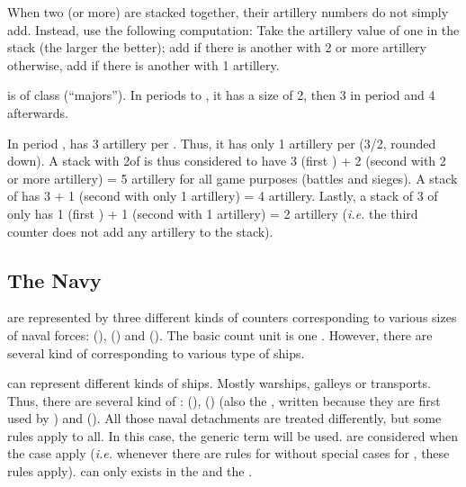 
 When two (or more) \ARMY are stacked together,
their artillery numbers do not simply add. Instead, use the following
computation:
\bparag Take the artillery value of one \ARMY in the stack (the larger the
better); add  if there is another \ARMY with 2 or more artillery
otherwise, add  if there is another \ARMY with 1 artillery.

\begin{exemple}
  \FRA is of class \CAIV (``majors''). In periods  to ,
  it has a size of 2, then 3 in period  and 4 afterwards.

  In period , \FRA has 3 artillery per \ARMY\faceplus. Thus, it has
  only 1 artillery per \ARMY\facemoins (3/2, rounded down). A stack with
  2\ARMY\faceplus of \FRA is thus considered to have 3 (first \ARMY) + 2
  (second \ARMY with 2 or more artillery) = 5 artillery for all game purposes
  (battles and sieges). A stack of \ARMY\faceplus \ARMY\facemoins has 3 + 1
  (second \ARMY with only 1 artillery) = 4 artillery. Lastly, a stack of 3
  \ARMY\facemoins of \FRA only has 1 (first \ARMY) + 1 (second \ARMY with 1
  artillery) = 2 artillery (\emph{i.e.} the third \ARMY counter does not add
  any artillery to the stack).
\end{exemple}



\subsection{The Navy}

 are represented by three different kinds of counters
corresponding to various sizes of naval forces:  (\FLEET),
 (\ND) and 
(\NDE).
\bparag The basic count unit is one \ND. However, there are several kind of
\ND corresponding to various type of ships.

 \ND can represent different kinds of
ships. Mostly warships, galleys or transports.
\bparag Thus, there are several kind of \ND: 
(\NWD),  (\NGD) (also the ,
written \VGD because they are first used by \VEN) and  (\NTD).
\bparag All those naval detachments are treated differently, but some rules
apply to all. In this case, the generic term \ND will be used.
\bparag \VGD are considered \NGD when the case apply (\emph{i.e.} whenever
there are rules for \NGD without special cases for \VGD, these rules apply).
\bparag \NGD can only exists in the \regionMediterrannee and the
\regionBaltique.

